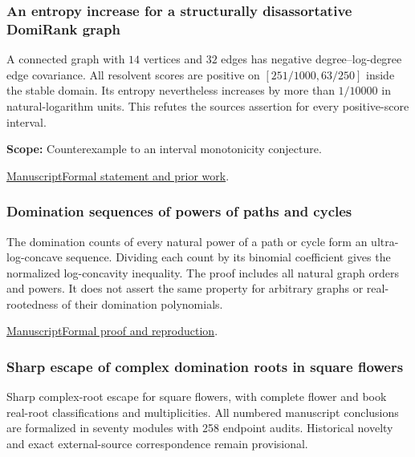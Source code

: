 \documentclass[11pt,a4paper]{article}
\begin{document}
\subsubsection{An entropy increase for a structurally disassortative DomiRank graph}

A connected graph with $14$ vertices and $32$ edges has negative degree--log-degree edge covariance. All resolvent scores are positive on $[251/1000,63/250]$ inside the stable domain. Its entropy nevertheless increases by more than $1/10000$ in natural-logarithm units. This refutes the source\textquotesingle s assertion for every positive-score interval.

\par\smallskip

\noindent\textbf{Scope:} Counterexample to an interval monotonicity conjecture.

\par\smallskip

\noindent\href{https://github.com/dvgyl/math-and-theory/blob/main/papers/mathematics/domirank-entropy/paper.pdf}{Manuscript}\quad\href{https://github.com/dvgyl/math-and-theory/blob/main/lean/docs/mathematics/domirank-entropy.md}{Formal statement and prior work}.

\subsubsection{Domination sequences of powers of paths and cycles}

The domination counts of every natural power of a path or cycle form an ultra-log-concave sequence. Dividing each count by its binomial coefficient gives the normalized log-concavity inequality. The proof includes all natural graph orders and powers. It does not assert the same property for arbitrary graphs or real-rootedness of their domination polynomials.

\noindent\href{https://github.com/dvgyl/math-and-theory/blob/main/papers/mathematics/galvin-zhang/manuscript.pdf}{Manuscript}\quad\href{https://github.com/dvgyl/math-and-theory/blob/main/papers/mathematics/galvin-zhang/README.md}{Formal proof and reproduction}.

\subsubsection{Sharp escape of complex domination roots in square flowers}

Sharp complex-root escape for square flowers, with complete flower and book real-root classifications and multiplicities. All numbered manuscript conclusions are formalized in seventy modules with 258 endpoint audits. Historical novelty and exact external-source correspondence remain provisional.
\end{document}
